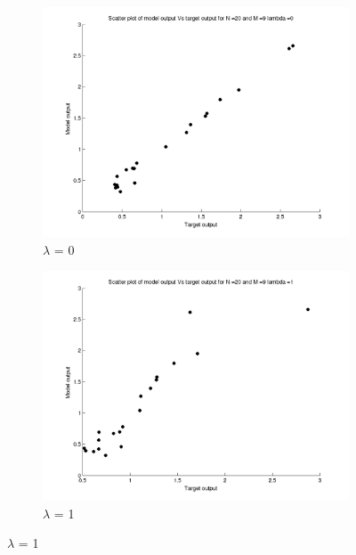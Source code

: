 \documentclass{article}
\begin{document}
\begin{figure}[H]

\begin{subfigure}{.5\textwidth}
\centering
\includegraphics[width=\linewidth]{Scatter_1/Varyinglambda_N20M9lambda0}
\caption{$\lambda$ = 0}
\end{subfigure}
\begin{subfigure}{.5\textwidth}
\includegraphics[width=\linewidth]{Scatter_1/Varyinglambda_N20M9lambda1}
\caption{$\lambda$ = 1}
\end{subfigure}



\end{figure}
\end{document}
